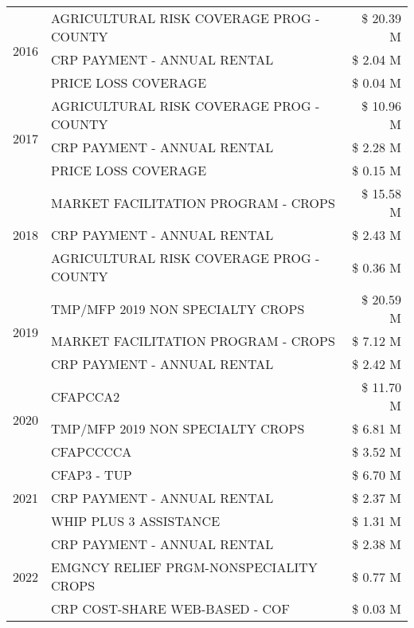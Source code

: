\begin{tabular}{llr}
\cline{1-3}
\multirow[t]{3}{*}{2016} & AGRICULTURAL RISK COVERAGE PROG - COUNTY & \$ 20.39 M \\
 & CRP PAYMENT - ANNUAL RENTAL & \$ 2.04 M \\
 & PRICE LOSS COVERAGE & \$ 0.04 M \\
\cline{1-3}
\multirow[t]{3}{*}{2017} & AGRICULTURAL RISK COVERAGE PROG - COUNTY & \$ 10.96 M \\
 & CRP PAYMENT - ANNUAL RENTAL & \$ 2.28 M \\
 & PRICE LOSS COVERAGE & \$ 0.15 M \\
\cline{1-3}
\multirow[t]{3}{*}{2018} & MARKET FACILITATION PROGRAM - CROPS & \$ 15.58 M \\
 & CRP PAYMENT - ANNUAL RENTAL & \$ 2.43 M \\
 & AGRICULTURAL RISK COVERAGE PROG - COUNTY & \$ 0.36 M \\
\cline{1-3}
\multirow[t]{3}{*}{2019} & TMP/MFP 2019 NON SPECIALTY CROPS & \$ 20.59 M \\
 & MARKET FACILITATION PROGRAM - CROPS & \$ 7.12 M \\
 & CRP PAYMENT - ANNUAL RENTAL & \$ 2.42 M \\
\cline{1-3}
\multirow[t]{3}{*}{2020} & CFAPCCA2 & \$ 11.70 M \\
 & TMP/MFP 2019 NON SPECIALTY CROPS & \$ 6.81 M \\
 & CFAPCCCCA & \$ 3.52 M \\
\cline{1-3}
\multirow[t]{3}{*}{2021} & CFAP3 - TUP & \$ 6.70 M \\
 & CRP PAYMENT - ANNUAL RENTAL & \$ 2.37 M \\
 & WHIP PLUS 3 ASSISTANCE & \$ 1.31 M \\
\cline{1-3}
\multirow[t]{3}{*}{2022} & CRP PAYMENT - ANNUAL RENTAL & \$ 2.38 M \\
 & EMGNCY RELIEF PRGM-NONSPECIALITY CROPS & \$ 0.77 M \\
 & CRP COST-SHARE WEB-BASED - COF & \$ 0.03 M \\
\cline{1-3}
\bottomrule
\end{tabular}
